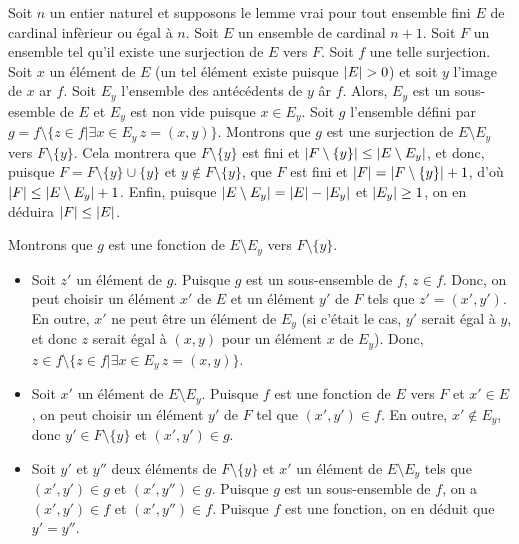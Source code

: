     Soit $n$ un entier naturel et supposons le lemme vrai pour tout ensemble fini $E$ de cardinal infèrieur ou égal à $n$. 
    Soit $E$ un ensemble de cardinal $n+1$. 
    Soit $F$ un ensemble tel qu'il existe une surjection de $E$ vers $F$. 
    Soit $f$ une telle surjection. 
    Soit $x$ un élément de $E$ (un tel élément existe puisque $\left\lvert E \right\rvert > 0$) et soit $y$ l'image de $x$ ar $f$.
    Soit $E_y$ l'ensemble des antécédents de $y$ âr $f$. 
    Alors, $E_y$ est un sous-esemble de $E$ et $E_y$ est non vide puisque $x \in E_y$.
    Soit $g$ l'ensemble défini par $g = f \setminus \lbrace z \in f \vert \exists x \in E_y \, z = (x,y) \rbrace$.
    Montrons que $g$ est une surjection de $E \setminus E_y$ vers $F \setminus \lbrace y \rbrace$.
    Cela montrera que $F \setminus \lbrace y \rbrace$ est fini et $\left\lvert F \setminus \lbrace y \rbrace \right\rvert \leq \left\lvert E \setminus E_y \right\rvert$, et donc, puisque $F = F \setminus \lbrace y \rbrace \cup \lbrace y \rbrace$ et $y \notin F \setminus \lbrace y \rbrace$, que $F$ est fini et $\left\lvert F \right\rvert = \left\lvert F \setminus \lbrace y \rbrace \right\rvert + 1$, d'où $\left\lvert F \right\rvert \leq \left\lvert E \setminus E_y \right\rvert + 1$. 
    Enfin, puisque $\left\lvert E \setminus E_y \right\rvert = \left\lvert E \right\rvert - \left\lvert E_y \right\rvert$ et $\left\lvert E_y \right\rvert \geq 1$, on en déduira $\left\lvert F \right\rvert \leq \left\lvert E \right\rvert$.

    Montrons que $g$ est une fonction de $E \setminus E_y$ vers $F \setminus \lbrace y \rbrace$.
    \begin{itemize}[nosep]
        \item Soit $z'$ un élément de $g$.
            Puisque $g$ est un sous-ensemble de $f$, $z \in f$. 
            Donc, on peut choisir un élément $x'$ de $E$ et un élément $y'$ de $F$ tels que $z' = (x',y')$.
            En outre, $x'$ ne peut être un élément de $E_y$ (si c'était le cas, $y'$ serait égal à $y$, et donc $z$ serait égal à $(x,y)$ pour un élément $x$ de $E_y$).
            Donc, $z \in f \setminus \lbrace z \in f \vert \exists x \in E_y \, z = (x,y) \rbrace$.
        \item Soit $x'$ un élément de $E \setminus E_y$. 
            Puisque $f$ est une fonction de $E$ vers $F$ et $x' \in E$, on peut choisir un élément $y'$ de $F$ tel que $(x',y') \in f$.
            En outre, $x' \notin E_y$, donc $y' \in F \setminus \lbrace y \rbrace$ et $(x',y') \in g$.
        \item Soit $y'$ et $y''$ deux éléments de $F \setminus \lbrace y \rbrace$ et $x'$ un élément de $E \setminus E_y$ tels que $(x',y') \in g$ et $(x', y'') \in g$. 
            Puisque $g$ est un sous-ensemble de $f$, on a $(x',y') \in f$ et $(x', y'') \in f$.
            Puisque $f$ est une fonction, on en déduit que $y' = y''$.
    \end{itemize}

